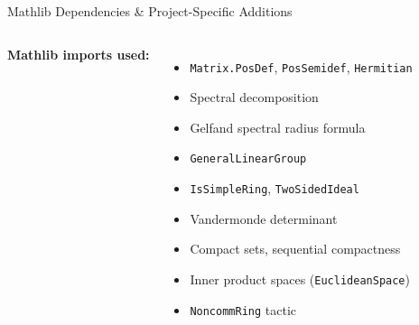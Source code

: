 \documentclass[aspectratio=169,10pt]{beamer}
\begin{document}
\begin{frame}{Mathlib Dependencies \& Project-Specific Additions}
    \vspace{-0.5em}

    \begin{columns}[T]
        \textbf{\textcolor{leanblue}{Mathlib imports used:}}
        \begin{itemize}\itemsep0.08em\scriptsize
            \item[\textcolor{leanblue}{$\bullet$}] \texttt{Matrix.PosDef}, \texttt{PosSemidef}, \texttt{Hermitian}
            \item[\textcolor{leanblue}{$\bullet$}] Spectral decomposition
            \item[\textcolor{leanblue}{$\bullet$}] Gelfand spectral radius formula
            \item[\textcolor{leanblue}{$\bullet$}] \texttt{GeneralLinearGroup}
            \item[\textcolor{leanblue}{$\bullet$}] \texttt{IsSimpleRing}, \texttt{TwoSidedIdeal}
            \item[\textcolor{leanblue}{$\bullet$}] Vandermonde determinant
            \item[\textcolor{leanblue}{$\bullet$}] Compact sets, sequential compactness
            \item[\textcolor{leanblue}{$\bullet$}] Inner product spaces (\texttt{EuclideanSpace})
            \item[\textcolor{leanblue}{$\bullet$}] \texttt{NoncommRing} tactic
        \end{itemize}


\end{columns}
\end{frame}
\end{document}
